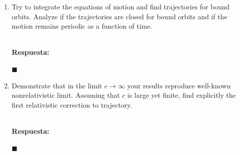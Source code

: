 \documentclass[]{article}
\numberwithin{equation}{section}
\newcommand{\0}{\textcolor{gray}{0}}
\newcommand{\qed}{\hfill\(\blacksquare\)}
\newcommand{\resp}{
	\\
	
	\textbf{Respuesta:} }
\begin{document}
\begin{enumerate}
	\qed
	
	\item[(c)] Try to integrate the equations of motion and find trajectories for bound orbits. Analyze if the trajectories are closed for bound orbits and if the motion remains periodic as a function of time.
	\resp
	
	\qed
	
	\item[(d)] Demonstrate that in the limit $c\rightarrow\infty$ your results reproduce well-known nonrelativistic limit. Assuming that $c$ is large yet finite, find explicitly the first relativistic correction to trajectory.
	\resp
	
	\qed
	
\end{enumerate}
\end{document}

